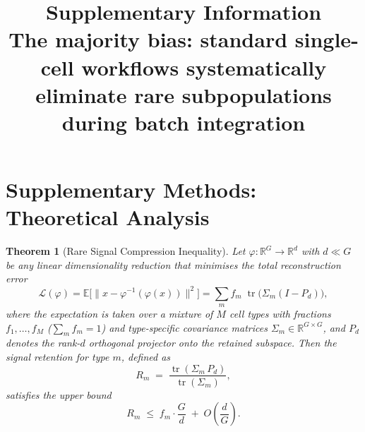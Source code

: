 \documentclass[10pt]{article}
\title{\textbf{Supplementary Information}\\[0.5em]
\large The majority bias: standard single-cell workflows systematically eliminate rare subpopulations during batch integration}
\author{}
\date{}
\newtheorem{theorem}{Theorem}
\DeclareMathOperator{\tr}{tr}
\begin{document}
\maketitle
\tableofcontents
\newpage


\section*{Supplementary Methods: Theoretical Analysis}


\begin{theorem}[Rare Signal Compression Inequality]
\label{thm:compression}
Let $\varphi \colon \mathbb{R}^G \to \mathbb{R}^d$ with $d \ll G$ be any linear
dimensionality reduction that minimises the total reconstruction error
\[
    \mathcal{L}(\varphi)
    = \mathbb{E}\bigl[\|x - \varphi^{-1}(\varphi(x))\|^2\bigr]
    = \sum_{m} f_m \;\tr\!\bigl(\Sigma_m (I - P_d)\bigr),
\]
where the expectation is taken over a mixture of $M$ cell types with
fractions $f_1,\dots,f_M$ ($\sum_m f_m = 1$) and type-specific covariance
matrices $\Sigma_m \in \mathbb{R}^{G \times G}$, and $P_d$ denotes the
rank-$d$ orthogonal projector onto the retained subspace.  Then the
\emph{signal retention} for type $m$, defined as
\[
    R_m \;=\; \frac{\tr(\Sigma_m\, P_d)}{\tr(\Sigma_m)},
\]
satisfies the upper bound
\begin{equation}
\label{eq:retention-bound}
    R_m \;\le\; f_m \cdot \frac{G}{d} \;+\; O\!\!\left(\frac{d}{G}\right).
\end{equation}
\end{theorem}
\end{document}
